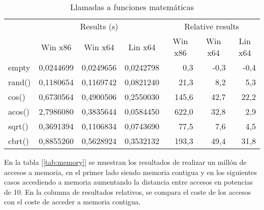 \begin{table}[h]
\centering
\begin{tabular}{@{}l|rrr|rrr|@{}}
\cmidrule(l){2-7}
                             & \multicolumn{3}{c|}{Results (s)}                                                               & \multicolumn{3}{c|}{Relative results}                                                      \\ \cmidrule(l){2-7} 
                             & \multicolumn{1}{c|}{Win x86} & \multicolumn{1}{c|}{Win x64} & \multicolumn{1}{c|}{Lin x64} & \multicolumn{1}{c|}{Win x86} & \multicolumn{1}{c|}{Win x64} & \multicolumn{1}{c|}{Lin x64} \\ \midrule
\multicolumn{1}{|l|}{empty}  & 0,0244699                    & 0,0249656                    & 0,0242798                    & 0,3                          & -0,3                         & -0,4                         \\ \cmidrule(r){1-1}
\multicolumn{1}{|l|}{rand()} & 0,1180654                    & 0,1169742                    & 0,0821240                    & 21,3                         & 8,2                          & 5,3                          \\ \cmidrule(r){1-1}
\multicolumn{1}{|l|}{cos()}  & 0,6730564                    & 0,4900506                    & 0,2550030                    & 145,6                        & 42,7                         & 22,2                         \\ \cmidrule(r){1-1}
\multicolumn{1}{|l|}{acos()} & 2,7986080                    & 0,3835644                    & 0,0584450                    & 622,0                        & 32,8                         & 2,9                          \\ \cmidrule(r){1-1}
\multicolumn{1}{|l|}{sqrt()} & 0,3691394                    & 0,1106834                    & 0,0743690                    & 77,5                         & 7,6                          & 4,5                          \\ \cmidrule(r){1-1}
\multicolumn{1}{|l|}{cbrt()} & 0,8855260                    & 0,5628924                    & 0,3532132                    & 193,3                        & 49,4                         & 31,8                         \\ \bottomrule
\end{tabular}
\caption{Llamadas a funciones matemáticas}
\label{tab:functions}
\end{table}

En la tabla [\ref{tab:memory}] se muestran los resultados de realizar un millón de accesos a memoria, en el primer lado siendo memoria contigua y en los siguientes casos accediendo a memoria aumentando la distancia entre accesos en potencias de 10. En la columna de resultados relativos, se compara el coste de los accesos con el coste de acceder a memoria contigua.\\

